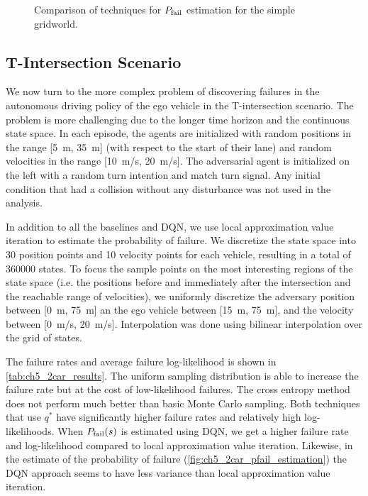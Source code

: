 \begin{figure}
        \centering
        
        \caption{Comparison of techniques for $P_{\rm fail}$ estimation for the simple gridworld.}
        \label{fig:gridworld_pfail_vs_samples}
\end{figure}



\subsection{T-Intersection Scenario}
\label{sec:ch5_Tint}
We now turn to the more complex problem of discovering failures in the autonomous driving policy of the ego vehicle in the T-intersection scenario. The problem is more challenging due to the longer time horizon  and the continuous state space. In each episode, the agents are initialized with random positions in the range [\SI{5}{m}, \SI{35}{m}] (with respect to the start of their lane) and random velocities in the range [\SI{10}{m/s}, \SI{20}{m/s}]. The adversarial agent is initialized on the left with a random turn intention and match turn signal. Any initial condition that had a collision without any disturbance was not used in the analysis. 

In addition to all the baselines and DQN, we use local approximation value iteration to estimate the probability of failure. We discretize the state space into \num{30} position points and \num{10} velocity points for each vehicle, resulting in a total of \num{360000} states. To focus the sample points on the most interesting regions of the state space (i.e. the positions before and immediately after the intersection and the reachable range of velocities), we uniformly discretize the adversary position between [\SI{0}{m}, \SI{75}{m}] an the ego vehicle between [\SI{15}{m}, \SI{75}{m}], and the velocity between [\SI{0}{m/s}, \SI{20}{m/s}]. Interpolation was done using bilinear interpolation over the grid of states. 


The failure rates and average failure log-likelihood is shown in \cref{tab:ch5_2car_results}. The uniform sampling distribution is able to increase the failure rate but at the cost of low-likelihood failures. The cross entropy method does not perform much better than basic Monte Carlo sampling. Both techniques that use $q^*$ have significantly higher failure rates and relatively high log-likelihoods. When $P_{\rm fail}(s)$ is estimated using DQN, we get a higher failure rate and log-likelihood compared to local approximation value iteration. Likewise, in the estimate of the probability of failure (\cref{fig:ch5_2car_pfail_estimation}) the DQN approach seems to have less variance than local approximation value iteration. 

